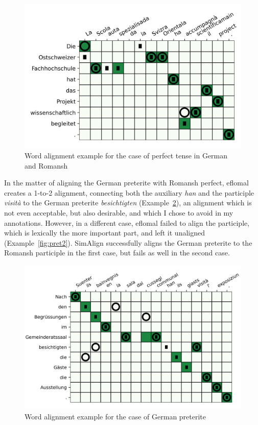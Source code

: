 \begin{figure}[ht]
\includegraphics{graphics/alignments/example7-prefect2.png}
\caption{Word alignment example for the case of perfect tense in German and Romansh}\label{fig:alignment-perfect2}
\end{figure}





In the matter of aligning the German preterite with Romansh perfect, eflomal creates a 1-to-2 alignment, connecting both the auxiliary \emph{han} and the participle \emph{visità} to the German preterite \emph{besichtigten} (Example~\ref{fig:pret1}), an alignment which is not even acceptable, but also desirable, and which I chose to avoid in my annotations. However, in a different case, eflomal failed to align the participle, which is lexically the more important part, and left it unaligned (Example~\ref{fig:pret2}). 
SimAlign successfully aligns the German preterite to the Romansh participle in the first case, but fails as well in the second case.


\begin{figure}[ht]
\includegraphics{graphics/alignments/example3.png}
\caption{Word alignment example for the case of German preterite}\label{fig:pret1}
\end{figure}

